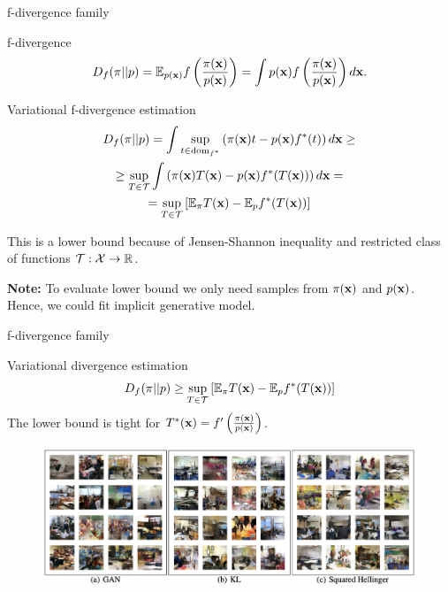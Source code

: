 \begin{frame}{f-divergence family}
	\vspace{-0.4cm}
	\begin{block}{f-divergence}
		\vspace{-0.3cm}
		\[
		D_f(\pi || p) = \mathbb{E}_{p(\mathbf{x})}  f\left( \frac{\pi(\mathbf{x})}{p(\mathbf{x})} \right)  = \int p(\mathbf{x}) f\left( \frac{\pi(\mathbf{x})}{p(\mathbf{x})} \right) d \mathbf{x}.
		\]
		\vspace{-0.4cm}
	\end{block}
	\begin{block}{Variational f-divergence estimation}
		\vspace{-0.8cm}
		\begin{multline*}
			D_f(\pi || p)  = \int \sup_{t \in \text{dom}_{f^*}} \left( \pi(\mathbf{x})t - p(\mathbf{x}) f^*(t) \right) d \mathbf{x} \geq \\
			 \geq \sup_{T \in \mathcal{T}} \int \left( \pi(\mathbf{x})T(\mathbf{x}) - p(\mathbf{x}) f^*(T(\mathbf{x})) \right) d \mathbf{x} = \\
			 = \sup_{T \in \mathcal{T}} \left[\mathbb{E}_{\pi}T(\mathbf{x}) -  \mathbb{E}_p f^*(T(\mathbf{x})) \right]
		\end{multline*}
	\vspace{-0.6cm}
	\end{block}
	This is a lower bound because of Jensen-Shannon inequality and restricted class of functions $\mathcal{T}: \mathcal{X} \rightarrow \mathbb{R}$.
	
	\textbf{Note:} To evaluate lower bound we only need samples from $\pi(\mathbf{x})$ and $p(\mathbf{x})$. Hence, we could fit implicit generative model.
\end{frame}
\begin{frame}{f-divergence family}
	\begin{block}{Variational divergence estimation}
		\[
			D_f(\pi || p) \geq \sup_{T \in \mathcal{T}} \left[\mathbb{E}_{\pi}T(\mathbf{x}) -  \mathbb{E}_p f^*(T(\mathbf{x})) \right]
		\]
		The lower bound is tight for $T^*(\mathbf{x}) = f'\left( \frac{\pi(\mathbf{x})}{p(\mathbf{x})} \right)$.
	\end{block}
	\begin{figure}
		\centering
		\includegraphics[width=1.0\linewidth]{figs/f_div_results}
	\end{figure}

\end{frame}
